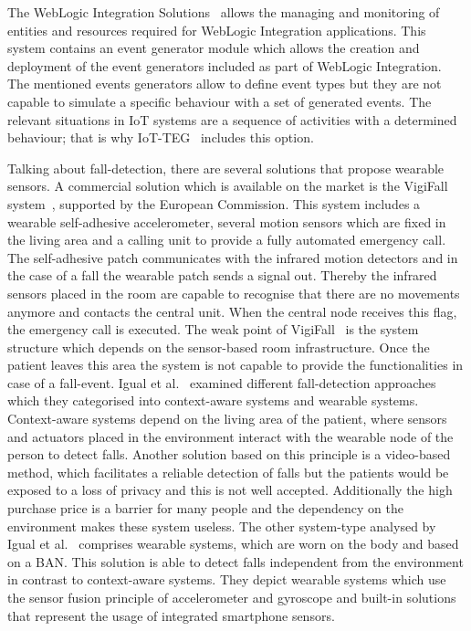 \documentclass[conference]{IEEEtran}
\theoremstyle{definition}
\begin{document}
The WebLogic Integration Solutions~\cite{WebLogic:2016} allows the managing and monitoring of entities and resources 
required for WebLogic Integration applications. This system contains an event generator module which allows the 
creation and deployment of the event generators included as part of WebLogic Integration. The mentioned events 
generators allow to define event types but they are not capable to simulate a specific behaviour with a set of 
generated events. The relevant situations in IoT systems are a sequence of activities with a determined behaviour; 
that is why IoT-TEG~\cite{TesisGutierrez2017,Gutierrez2017} includes this option.

Talking about fall-detection, there are several solutions that propose wearable sensors. A commercial solution which is 
available on the market is the VigiFall system~\cite{Vigilio,EuropeanCommission2013}, supported by the European Commission. This system 
includes a wearable self-adhesive accelerometer, several motion sensors which are fixed in the living area and a calling unit to provide 
a fully automated emergency call. The self-adhesive patch communicates with the infrared motion detectors and in the case of a fall the 
wearable patch sends a signal out. Thereby the infrared sensors placed in the room are capable to recognise that there are no movements anymore and 
contacts the central unit. When the central node receives this flag, the emergency call is executed. The weak point of VigiFall~\cite{Vigilio} is 
the system structure which depends on the sensor-based room infrastructure. Once the patient leaves this area the system is not capable 
to provide the functionalities in case of a fall-event. Igual et al.~\cite{Igual2013} examined different fall-detection approaches which they 
categorised into context-aware systems and wearable systems. Context-aware systems depend on the living area of the patient, where 
sensors and actuators placed in the environment interact with the wearable node of the person to detect falls. Another solution based 
on this principle is a video-based method, which facilitates a reliable detection of falls but the patients would be exposed to a 
loss of privacy and this is not well accepted. Additionally the high purchase price is a barrier for many people and the dependency 
on the environment makes these system useless. The other system-type analysed by Igual et al.~\cite{Igual2013} comprises wearable systems, which 
are worn on the body and based on a BAN. This solution is able to detect falls independent from the environment in contrast to 
context-aware systems. They depict wearable systems which use the sensor fusion principle of accelerometer and gyroscope 
and built-in solutions that represent the usage of integrated smartphone sensors.
\end{document}
